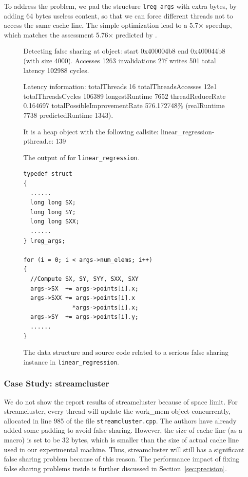 To address the problem, we pad the structure {\tt lreg\_args} with extra bytes, by adding 64 bytes useless content, so that we can force different threads not to access the same cache line. The simple optimization lead to a 5.7$\times$ speedup, which matches the assessment 5.76$\times$ predicted by \cheetah{}.

\begin{figure}
\begin{minipage}{\columnwidth}

\centering

\fbox
{
\begin{minipage}{3in}
Detecting false sharing at object: start 0x400004b8 end 0x400044b8 (with size 4000).  Accesses 1263 invalidations 27f writes 501 total latency 102988 cycles.

Latency information: totalThreads 16 totalThreadsAccesses 12e1 totalThreadsCycles 106389 longestRuntime 7652 threadReduceRate 0.164697 totalPossibleImprovementRate 576.172748\% (realRuntime 7738 predictedRuntime 1343).

It is a heap object with the following callsite:
linear\_regression-pthread.c: 139
\end{minipage}
}
\vspace{1em}
\caption{The output of \cheetah{} for \texttt{linear\_regression}.}
\label{fig:lr}
\end{minipage}
\end{figure}


\begin{figure}
\begin{verbatim}
typedef struct
{
  ......  
  long long SX;
  long long SY;
  long long SXX;
  ......
} lreg_args;	

for (i = 0; i < args->num_elems; i++)
{
  //Compute SX, SY, SYY, SXX, SXY
  args->SX  += args->points[i].x;
  args->SXX += args->points[i].x
              *args->points[i].x;
  args->SY  += args->points[i].y;
  ......
}
\end{verbatim}
\caption{The data structure and source code related to a serious false sharing instance in \texttt{linear\_regression}.}
\label{lr:code}
\end{figure}

\subsubsection{Case Study: streamcluster}

We do not show the report results of streamcluster because of space limit. For streamcluster, every thread will update the work\_mem object concurrently, allocated in line 985 of the file \texttt{streamcluster.cpp}. The authors have already added some padding to avoid false sharing. However, the size of cache line (as a macro) is set to be 32 bytes, which is smaller than the size of actual cache line used in our experimental machine. Thus, streamcluster will still has a significant false sharing problem because of this reason. The performance impact of fixing false sharing problems inside is further discussed in Section~\ref{sec:precision}. 


